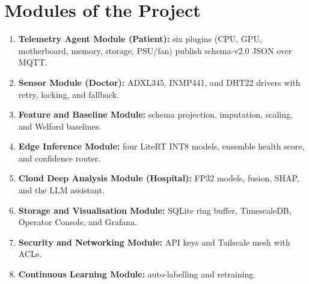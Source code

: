 \documentclass[12pt,a4paper]{report}
\begin{document}
\section{Modules of the Project}
\begin{enumerate}
  \item \textbf{Telemetry Agent Module (Patient):} six plugins (CPU, GPU, motherboard, memory, storage, PSU/fan) publish schema-v2.0 JSON over MQTT.
  \item \textbf{Sensor Module (Doctor):} ADXL345, INMP441, and DHT22 drivers with retry, locking, and fallback.
  \item \textbf{Feature and Baseline Module:} schema projection, imputation, scaling, and Welford baselines.
  \item \textbf{Edge Inference Module:} four LiteRT INT8 models, ensemble health score, and confidence router.
  \item \textbf{Cloud Deep Analysis Module (Hospital):} FP32 models, fusion, SHAP, and the LLM assistant.
  \item \textbf{Storage and Visualisation Module:} SQLite ring buffer, TimescaleDB, Operator Console, and Grafana.
  \item \textbf{Security and Networking Module:} API keys and Tailscale mesh with ACLs.
  \item \textbf{Continuous Learning Module:} auto-labelling and retraining.
\end{enumerate}
\end{document}
